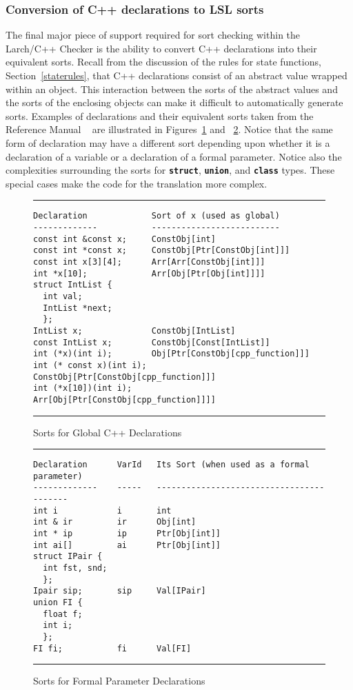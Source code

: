\documentclass[12pt]{article} %
\newcommand{\reserved}[1]{\textbf{\texttt{#1}}} %
\newcommand{\UNSPACEFORBOX}{\vspace{-2ex}}
\newcommand{\HLINE}{\UNSPACEFORBOX%
\begin{flushleft}\rule{\textwidth}{0.01in}\end{flushleft}%
\UNSPACEFORBOX}
\newenvironment{BFIGURE}{

\begin{figure}
\small
\HLINE
}{
\HLINE
\normalsize
\end{figure}
}
\begin{document}
\subsubsection{Conversion of C++ declarations to LSL sorts}

The final major piece of support required for sort checking within the
Larch/C++ Checker is the ability to convert C++ declarations into
their equivalent sorts. Recall from the discussion of the rules for
state functions, Section~\ref{staterules}, that C++ declarations
consist of an abstract value wrapped within an object. This
interaction between the sorts of the abstract values and the sorts of
the enclosing objects can make it difficult to automatically generate
sorts. Examples of declarations and their equivalent sorts taken from
the Reference Manual ~\cite[Chapter 5 and Section 6.1.8.1]{Leavens96c}
are illustrated in Figures~\ref{globalsorts} and
~\ref{formalsorts}. Notice that the same form of declaration may have
a different sort depending upon whether it is a declaration of a
variable or a declaration of a formal parameter. Notice also the
complexities surrounding the sorts for
\reserved{struct}, \reserved{union}, and \reserved{class} types. These
special cases make the code for the translation more complex.


\begin{BFIGURE}
\begin{verbatim}
Declaration             Sort of x (used as global)
-------------           --------------------------
const int &const x;     ConstObj[int]
const int *const x;     ConstObj[Ptr[ConstObj[int]]]
const int x[3][4];      Arr[Arr[ConstObj[int]]]
int *x[10];             Arr[Obj[Ptr[Obj[int]]]]
struct IntList {
  int val;
  IntList *next;
  };
IntList x;              ConstObj[IntList]
const IntList x;        ConstObj[Const[IntList]]
int (*x)(int i);        Obj[Ptr[ConstObj[cpp_function]]]
int (* const x)(int i); ConstObj[Ptr[ConstObj[cpp_function]]]
int (*x[10])(int i);    Arr[Obj[Ptr[ConstObj[cpp_function]]]]
\end{verbatim}
\caption{Sorts for Global C++ Declarations}
\label{globalsorts}
\end{BFIGURE}

\begin{BFIGURE}
\begin{verbatim}
Declaration      VarId   Its Sort (when used as a formal parameter)
-------------    -----   -----------------------------------------
int i            i       int
int & ir         ir      Obj[int]
int * ip         ip      Ptr[Obj[int]]
int ai[]         ai      Ptr[Obj[int]]
struct IPair {
  int fst, snd;
  };
Ipair sip;       sip     Val[IPair]
union FI {
  float f;
  int i;
  };
FI fi;           fi      Val[FI]
\end{verbatim}
\caption{Sorts for Formal Parameter Declarations}
\label{formalsorts}
\end{BFIGURE}
\end{document}
